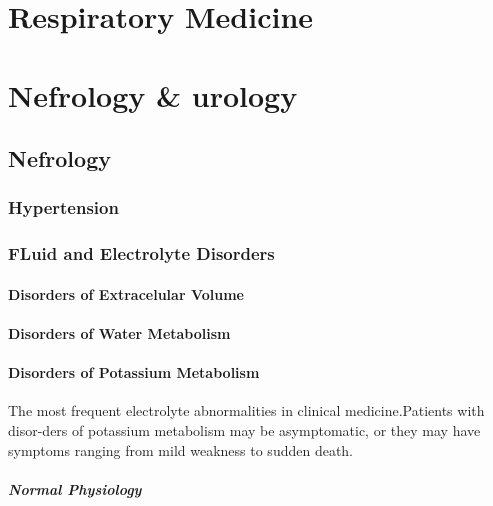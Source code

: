 \documentclass[
  letterpaper,
  DIV=11,
  numbers=noendperiod]{scrreprt}
\let\oldparagraph\paragraph
\renewcommand{\paragraph}[1]{\oldparagraph{#1}\mbox{}}
\begin{document}
\chapter{Respiratory Medicine}\label{respiratory-medicine}

\chapter{Nefrology \& urology}\label{nefrology-urology}

\section{Nefrology}\label{nefrology}

\subsection{Hypertension}\label{hypertension}

\subsection{FLuid and Electrolyte
Disorders}\label{fluid-and-electrolyte-disorders}

\subsubsection{Disorders of Extracelular
Volume}\label{disorders-of-extracelular-volume}

\subsubsection{Disorders of Water
Metabolism}\label{disorders-of-water-metabolism}

\subsubsection{Disorders of Potassium
Metabolism}\label{disorders-of-potassium-metabolism}

The most frequent electrolyte abnormalities in clinical
medicine.Patients with disor-ders of potassium metabolism may be
asymptomatic, or they may have symptoms ranging from mild weakness to
sudden death.

\paragraph{Normal Physiology}\label{normal-physiology}
\end{document}
